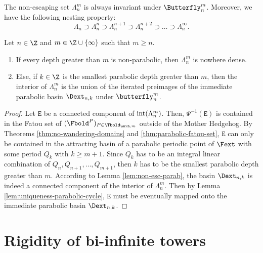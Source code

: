 \documentclass{amsart}
\begin{document}
The non-escaping set $\Lambda_n^m$ is always invariant under $\Butterfly_n^m$.
Moreover, we have the following nesting property:
\[
    \Lambda_n \supset \Lambda_n^n \supset \Lambda_n^{n+1} \supset \Lambda_n^{n+2} \supset \ldots \supset \Lambda_n^\infty.
\]

\begin{lemma}
\label{lem:nowhere-dense-02}
    Let $n \in \Z$ and $m \in \Z \cup \{\infty\}$ such that $m \geq n$.
    \begin{enumerate}
        \item If every depth greater than $m$ is non-parabolic, then $\Lambda_n^{m}$ is nowhere dense.
        \item Else, if $k \in \Z$ is the smallest parabolic depth greater than $m$, then the interior of $\Lambda_n^m$ is the union of the iterated preimages of the immediate parabolic basin $\Dext_{n,k}$ under $\butterfly_n^m$.
    \end{enumerate}
\end{lemma}

\begin{proof}
    Let $\mathtt{E}$ be a connected component of $\textnormal{int}(\Lambda_n^{m})$.
    Then, $\Psi^{-1}(\mathtt{E})$ is contained in the Fatou set of $(\Fbold^P)_{P \in \Tbold_{\Arch,m}}$ outside of the Mother Hedgehog. 
    By Theorems \ref{thm:no-wandering-domains} and \ref{thm:parabolic-fatou-set}, $\mathtt{E}$ can only be contained in the attracting basin of a parabolic periodic point of $\Fext$ with some period $Q_k$ with $k \geq m+1$. 
    Since $Q_k$ has to be an integral linear combination of $Q_n, Q_{n+1}, \ldots, Q_{m+1}$, then $k$ has to be the smallest parabolic depth greater than $m$. 
    According to Lemma \ref{lem:non-esc-parab}, the basin $\Dext_{n,k}$ is indeed a connected component of the interior of $\Lambda_n^m$.
    Then by Lemma \ref{lem:uniqueness-parabolic-cycle}, $\mathtt{E}$ must be eventually mapped onto the immediate parabolic basin $\Dext_{n,k}$.
\end{proof}




\section{Rigidity of bi-infinite towers}
\label{sec:qc-rigidity}
\end{document}
